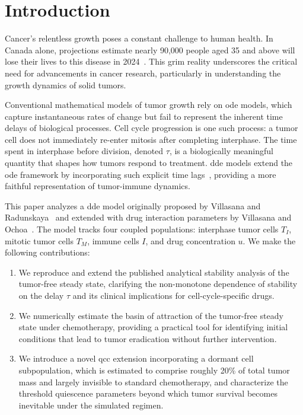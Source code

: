 \section{Introduction}
\label{sec:intro}

Cancer's relentless growth poses a constant challenge to human health. In Canada alone, projections estimate nearly 90,000 people aged 35 and above will lose their lives to this disease in 2024~\cite{pader_estimates_2021}. This grim reality underscores the critical need for advancements in cancer research, particularly in understanding the growth dynamics of solid tumors.

Conventional mathematical models of tumor growth rely on \gls{ode} models, which capture instantaneous rates of change but fail to represent the inherent time delays of biological processes. Cell cycle progression is one such process: a tumor cell does not immediately re-enter mitosis after completing interphase. The time spent in interphase before division, denoted $\tau$, is a biologically meaningful quantity that shapes how tumors respond to treatment. \gls{dde} models extend the \gls{ode} framework by incorporating such explicit time lags~\cite{niculescu_stability_2021}, providing a more faithful representation of tumor-immune dynamics.

This paper analyzes a \gls{dde} model originally proposed by Villasana and Radunskaya~\cite{villasana_delay_2003} and extended with drug interaction parameters by Villasana and Ochoa~\cite{villasana_heuristic_2004}. The model tracks four coupled populations: interphase tumor cells $T_I$, mitotic tumor cells $T_M$, immune cells $I$, and drug concentration $u$. We make the following contributions:

\begin{enumerate}
  \item We reproduce and extend the published analytical stability analysis of the tumor-free steady state, clarifying the non-monotone dependence of stability on the delay $\tau$ and its clinical implications for cell-cycle-specific drugs.
  \item We numerically estimate the basin of attraction of the tumor-free steady state under chemotherapy, providing a practical tool for identifying initial conditions that lead to tumor eradication without further intervention.
  \item We introduce a novel \gls{qcc} extension incorporating a dormant cell
    subpopulation, which is estimated to comprise roughly 20\% of total tumor mass and largely invisible to standard chemotherapy, and characterize the threshold quiescence parameters beyond which tumor survival becomes inevitable under the simulated regimen.
\end{enumerate}

